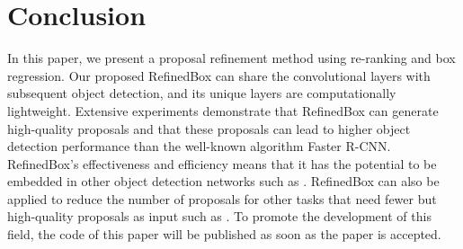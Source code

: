 \documentclass[letterpaper]{article} %
\begin{document}
\section{Conclusion}
%
In this paper, we present a proposal refinement
method using re-ranking and box regression.
Our proposed RefinedBox can share the convolutional
layers with subsequent object detection,
and its unique layers are computationally lightweight.
Extensive experiments demonstrate that RefinedBox can generate
high-quality proposals and that these proposals can lead to higher object
detection performance than the well-known algorithm Faster R-CNN.
RefinedBox's effectiveness and efficiency means that it has the
potential to be embedded in other object detection networks
such as \cite{ren2015faster,lin2016feature,kong2017ron}.
RefinedBox can also be applied to reduce the number of proposals
for other tasks that need fewer but high-quality proposals as input
such as \cite{wei2016hcp,paisitkriangkrai2016pedestrian,wu2015deep}.
To promote the development of this field, the code of this paper
will be published as soon as the paper is accepted.





\end{document}

